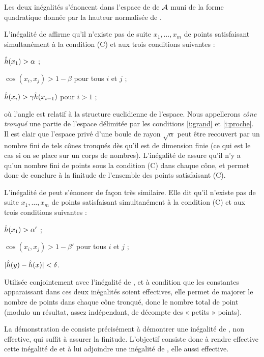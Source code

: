 Les deux inégalités s'énoncent dans l'espace de  de $\mathcal A$
muni de la forme quadratique donnée par la hauteur normalisée de
.

L'inégalité de  affirme qu'il n'existe pas de suite $x_1, \dots,
x_m$ de points satisfaisant simultanément à la condition (C) et aux trois
conditions suivantes :
\begin{enumthm}
  \item $\hat h (x_1) > \alpha$ ; \label{i:grand}
  \item $\cos(x_i, x_j) > 1 - \beta$ pour tous $i$ et $j$ ; \label{i:proche}
  \item $\hat h (x_i) > \gamma \hat h (x_{i-1})$ pour $i > 1$ ;
\end{enumthm}
où l'angle est relatif à la structure euclidienne de l'espace. Nous
appellerons \emph{cône tronqué} une partie de l'espace délimitée par les
conditions \ref{i:grand} et \ref{i:proche}. Il est clair que l'espace privé
d'une boule de rayon $\sqrt{\alpha}$ peut être recouvert par un nombre fini de
tels cônes tronqués dès qu'il est de dimension finie (ce qui est le cas si on
se place sur un corps de nombres). L'inégalité de  assure qu'il
n'y a qu'un nombre fini de points sous la condition (C) dans chaque cône,
et permet donc de conclure à la finitude de l'ensemble des points satisfaisant
(C).

L'inégalité de  peut s'énoncer de façon très similaire. Elle dit
qu'il n'existe pas de suite $x_1, \dots, x_m$ de points satisfaisant
simultanément à la condition (C) et aux trois conditions suivantes :
\begin{enumthm}
  \item $\hat h (x_1) > \alpha'$ ;
  \item $\cos(x_i, x_j) > 1 - \beta'$ pour tous $i$ et $j$ ;
  \item $\lvert \hat h (y) - \hat h (x) \rvert < \delta$.
\end{enumthm}
Utilisée conjointement avec l'inégalité de , et à condition que les
constantes apparaissant dans ces deux inégalités soient effectives, elle
permet de majorer le nombre de points dans chaque cône tronqué, donc le nombre
total de point (modulo un résultat, assez indépendant, de décompte des «
petits » points).

La démonstration de  consiste précisément à démontrer une
inégalité de , non effective, qui suffit à assurer la finitude.
L'objectif consiste donc à rendre effective cette inégalité de  et
à lui adjoindre une inégalité de , elle aussi effective.

